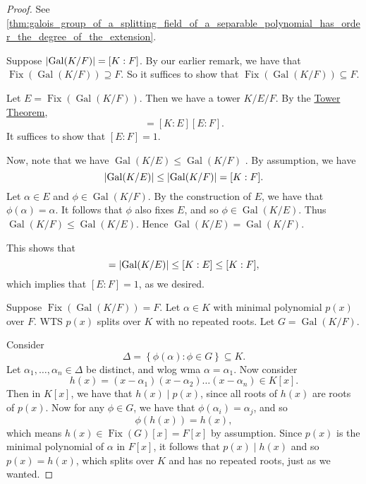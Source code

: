 \documentclass[notoc,notitlepage]{tufte-book}
\DeclareMathOperator{\Gal}{Gal}
\DeclareMathOperator{\Fix}{Fix}
\begin{document}
\begin{proof}
   See
  \cref{thm:galois_group_of_a_splitting_field_of_a_separable_polynomial_has_order_the_degree_of_the_extension}.

  \noindent
   Suppose $\abs{ \Gal(K / F) } = [ K : F ]$. By
  our earlier remark, we have that $\Fix(\Gal(K / F)) \supseteq F$. So it
  suffices to show that $\Fix(\Gal(K / F)) \subseteq F$.

  Let $E = \Fix(\Gal(K / F))$. Then we have a tower $K / E / F$. By the
  \hyperref[thm:tower_theorem]{Tower Theorem},
  \begin{equation*}
    [K : F] = [K : E][E : F].
  \end{equation*}
  It suffices to show that $[ E : F ] = 1$.
  
  Now, note that we have $\Gal(K / E) \leq \Gal(K / F)$ . By assumption, we have
  \begin{equation*}
    \abs{ \Gal(K / E) } \leq \abs{ \Gal(K / F) } = [K : F].
  \end{equation*}
  Let $\alpha \in E$ and $\phi \in \Gal(K / F)$. By the construction of $E$, we
  have that $\phi(\alpha) = \alpha$. It follows that $\phi$ also fixes $E$, and
  so $\phi \in \Gal(K / E)$. Thus $\Gal(K / F) \leq \Gal(K / E)$. Hence $\Gal(K
  / E) = \Gal(K / F)$.

  This shows that
  \begin{equation*}
    [ K : F ] = \abs{ \Gal(K / E) } \leq [ K : E ] \leq [ K : F ],
  \end{equation*}
  which implies that $[E : F] = 1$, as we desired.

  \noindent
   Suppose $\Fix(\Gal(K / F)) = F$. Let $\alpha \in
  K$ with minimal polynomial $p(x)$ over $F$. WTS $p(x)$ splits over $K$ with
  no repeated roots. Let $G = \Gal(K / F)$.

  Consider 
  \begin{equation*}
    \Delta = \left\{ \phi(\alpha) : \phi \in G \right\} \subseteq K.
  \end{equation*}
  Let $\alpha_1, \ldots, \alpha_n \in \Delta$ be distinct, and wlog wma $\alpha
  = \alpha_1$. Now consider
  \begin{equation*}
    h(x) = (x - \alpha_1)(x - \alpha_2) \hdots (x - \alpha_n) \in K[x].
  \end{equation*}
  Then in $K[x]$, we have that $h(x) \mid p(x)$, since all roots of $h(x)$ are
  roots of $p(x)$. Now for any $\phi \in G$, we have that $\phi(\alpha_i) =
  \alpha_j$, and so
  \begin{equation*}
    \phi(h(x)) = h(x),
  \end{equation*}
  which means $h(x) \in \Fix(G)[x] = F[x]$ by assumption. Since $p(x)$ is the
  minimal polynomial of $\alpha$ in $F[x]$, it follows that $p(x) \mid h(x)$ and
  so $p(x) = h(x)$, which splits over $K$ and has no repeated roots, just as we
  wanted.


\end{proof}
\end{document}
